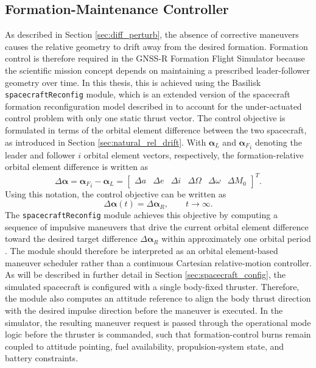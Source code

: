 \subsection{Formation-Maintenance Controller}
\label{sec:formation_controller}
As described in Section \ref{sec:diff_perturb}, the absence of corrective maneuvers causes the relative geometry to drift away from the desired formation. Formation control is therefore required in the GNSS-R Formation Flight Simulator because the scientific mission concept depends on maintaining a prescribed leader-follower geometry over time. In this thesis, this is achieved using the Basilisk \texttt{spacecraftReconfig} module, which is an extended version of the spacecraft formation reconfiguration model described in \cite{schaub2018analytical} to account for the under-actuated control problem with only one static thrust vector. The control objective is formulated in terms of the orbital element difference between the two spacecraft, as introduced in Section \ref{sec:natural_rel_drift}. With $\boldsymbol{\alpha}_L$ and ${\boldsymbol{\alpha}_F}_i$ denoting the leader and follower $i$ orbital element vectors, respectively, the formation-relative orbital element difference is written as
\begin{equation}
    \Delta \boldsymbol{\alpha} = {\boldsymbol{\alpha}_F}_i - \boldsymbol{\alpha}_L = \begin{bmatrix}
        \Delta a & \Delta e & \Delta i & \Delta \Omega & \Delta \omega & \Delta M_0
    \end{bmatrix}^T .
    \label{eq:formation_oe_diff}
\end{equation}
Using this notation, the control objective can be written as
\begin{equation}
    \Delta\boldsymbol{\alpha}(t) = \Delta\boldsymbol{\alpha}_R,
    \qquad t \rightarrow \infty .
\end{equation}
The \texttt{spacecraftReconfig} module achieves this objective by computing a sequence of impulsive maneuvers that drive the current orbital element difference toward the desired target difference $\Delta\boldsymbol{\alpha}_R$ within approximately one orbital period \cite{spacecraftReconfig}. The module should therefore be interpreted as an orbital element-based maneuver scheduler rather than a continuous Cartesian relative-motion controller. As will be described in further detail in Section \ref{sec:spacecraft_config}, the simulated spacecraft is configured with a single body-fixed thruster. Therefore, the module also computes an attitude reference to align the body thrust direction with the desired impulse direction before the maneuver is executed. In the simulator, the resulting maneuver request is passed through the operational mode logic before the thruster is commanded, such that formation-control burns remain coupled to attitude pointing, fuel availability, propulsion-system state, and battery constraints.

